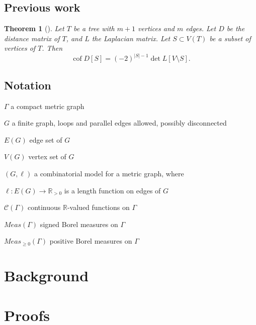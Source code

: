 \documentclass{amsart}
\newtheorem{thm}{Theorem}
\theoremstyle{definition}
\newcommand{\RR}{\mathbb{R}}
\newcommand{\cC}{\mathcal{C}}
\DeclareMathOperator{\cof}{cof}
\begin{document}
\subsection{Previous work} 

\begin{thm}[\cite{bapat-sivasubramanian}]
Let $T$ be a tree with $m+1$ vertices and $m$ edges.
Let $D$ be the distance matrix of $T$, and $L$ the Laplacian matrix.
Let $S \subset V(T)$ be a subset of vertices of $T$. 
Then
\begin{equation*}
\cof D[S] = (-2)^{|S|-1} \det L[V \setminus S] .
\end{equation*}
\end{thm}

\subsection{Notation}

$\Gamma$ a compact metric graph

$G$ a finite graph, 
loops and parallel edges allowed,
possibly disconnected

$E(G)$ edge set of $G$

$V(G)$ vertex set of $G$

$(G,\ell)$ a combinatorial model for a metric graph,
where 

$\ell : E(G) \to \RR_{>0}$
is a length function on edges of $G$

$\cC(\Gamma)$ continuous $\RR$-valued functions on $\Gamma$

$Meas(\Gamma)$ signed Borel measures on $\Gamma$

$Meas_{\geq 0}(\Gamma)$ positive Borel measures on $\Gamma$

\section{Background}


\section{Proofs}
\end{document}
